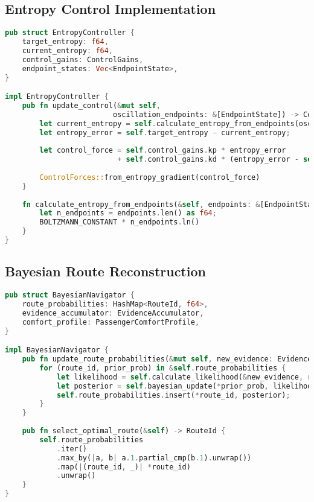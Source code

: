 \documentclass[11pt,a4paper]{article}
\begin{document}
\subsection{Entropy Control Implementation}

\begin{lstlisting}[language=Rust, caption=Real-time Entropy Controller]
pub struct EntropyController {
    target_entropy: f64,
    current_entropy: f64,
    control_gains: ControlGains,
    endpoint_states: Vec<EndpointState>,
}

impl EntropyController {
    pub fn update_control(&mut self, 
                         oscillation_endpoints: &[EndpointState]) -> ControlForces {
        let current_entropy = self.calculate_entropy_from_endpoints(oscillation_endpoints);
        let entropy_error = self.target_entropy - current_entropy;
        
        let control_force = self.control_gains.kp * entropy_error 
                          + self.control_gains.kd * (entropy_error - self.previous_error);
        
        ControlForces::from_entropy_gradient(control_force)
    }
    
    fn calculate_entropy_from_endpoints(&self, endpoints: &[EndpointState]) -> f64 {
        let n_endpoints = endpoints.len() as f64;
        BOLTZMANN_CONSTANT * n_endpoints.ln()
    }
}
\end{lstlisting}

\subsection{Bayesian Route Reconstruction}

\begin{lstlisting}[language=Rust, caption=Bayesian Navigation System]
pub struct BayesianNavigator {
    route_probabilities: HashMap<RouteId, f64>,
    evidence_accumulator: EvidenceAccumulator,
    comfort_profile: PassengerComfortProfile,
}

impl BayesianNavigator {
    pub fn update_route_probabilities(&mut self, new_evidence: Evidence) {
        for (route_id, prior_prob) in &self.route_probabilities {
            let likelihood = self.calculate_likelihood(&new_evidence, route_id);
            let posterior = self.bayesian_update(*prior_prob, likelihood);
            self.route_probabilities.insert(*route_id, posterior);
        }
    }
    
    pub fn select_optimal_route(&self) -> RouteId {
        self.route_probabilities
            .iter()
            .max_by(|a, b| a.1.partial_cmp(b.1).unwrap())
            .map(|(route_id, _)| *route_id)
            .unwrap()
    }
}
\end{lstlisting}
\end{document}

